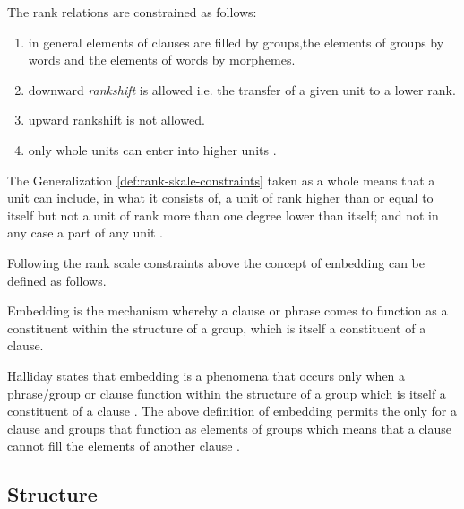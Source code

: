 \begin{generalization}\label{def:rank-skale-constraints}
	The rank relations are constrained as follows:
	\begin{enumerate}
        \item in general elements of clauses are filled by groups,the elements of groups by words and the elements of words by morphemes.
		\item downward \textit{rankshift} is allowed i.e. the transfer of a given unit to a lower rank. 
		\item upward rankshift is not allowed.
		\item only whole units can enter into higher units \citep[44]{Halliday2002}.
	\end{enumerate}
\end{generalization}

The Generalization \ref{def:rank-skale-constraints} taken as a whole means that a unit can include, in what it consists of, a unit of rank higher than or equal to itself but not a unit of rank more than one degree lower than itself; and not in any case a part of any unit \citep[42]{Halliday2002}. 

Following the rank scale constraints above the concept of embedding can be defined as follows. 

\begin{definition}[Embedding]\label{def:embedding0}
    Embedding is the mechanism whereby a clause or phrase comes to function as a constituent within the structure of a group, which is itself a constituent of a clause. \citep[242]{Halliday2013}
\end{definition}

Halliday states that embedding is a phenomena that occurs only when a phrase/group or clause function within the structure of a group which is itself a constituent of a clause \citep[242]{ifg2}. The above definition of embedding permits the only for a clause and groups that function as elements of groups which means that a clause cannot fill the elements of another clause \citep[237]{Fawcett2000}.

\subsection{Structure}
\label{sec:structure-sydney}

